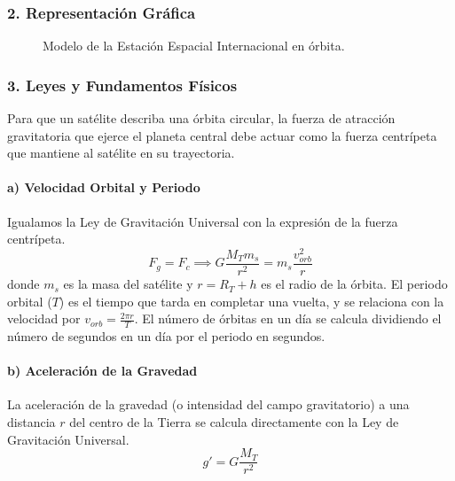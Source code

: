 \subsubsection*{2. Representación Gráfica}
\begin{figure}[H]
    \centering
    \caption{Modelo de la Estación Espacial Internacional en órbita.}
\end{figure}

\subsubsection*{3. Leyes y Fundamentos Físicos}
Para que un satélite describa una órbita circular, la fuerza de atracción gravitatoria que ejerce el planeta central debe actuar como la fuerza centrípeta que mantiene al satélite en su trayectoria.

\paragraph*{a) Velocidad Orbital y Periodo}
Igualamos la Ley de Gravitación Universal con la expresión de la fuerza centrípeta.
$$ F_g = F_c \implies G\frac{M_T m_s}{r^2} = m_s\frac{v_{orb}^2}{r} $$
donde $m_s$ es la masa del satélite y $r = R_T+h$ es el radio de la órbita.
El periodo orbital ($T$) es el tiempo que tarda en completar una vuelta, y se relaciona con la velocidad por $v_{orb} = \frac{2\pi r}{T}$. El número de órbitas en un día se calcula dividiendo el número de segundos en un día por el periodo en segundos.

\paragraph*{b) Aceleración de la Gravedad}
La aceleración de la gravedad (o intensidad del campo gravitatorio) a una distancia $r$ del centro de la Tierra se calcula directamente con la Ley de Gravitación Universal.
$$ g' = G\frac{M_T}{r^2} $$

